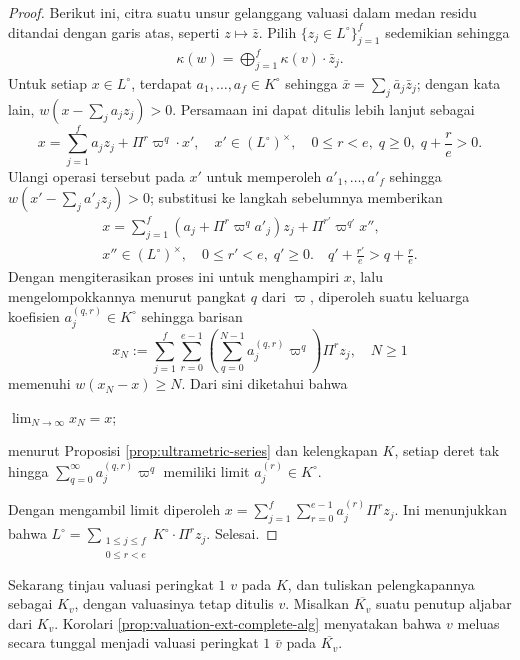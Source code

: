 \begin{proof}
	Berikut ini, citra suatu unsur gelanggang valuasi dalam medan residu ditandai dengan garis atas, seperti $z \mapsto \bar{z}$. Pilih $\{z_j \in L^\circ \}_{j=1}^f$ sedemikian sehingga
	\begin{gather*}
		\kappa(w) = \bigoplus_{j=1}^f \kappa(v) \cdot \bar{z}_j.
	\end{gather*}
	Untuk setiap $x \in L^\circ$, terdapat $a_1, \ldots, a_f \in K^\circ$ sehingga $\bar{x} = \sum_j \bar{a}_j \bar{z}_j$; dengan kata lain, $w(x - \sum_j a_j z_j) > 0$. Persamaan ini dapat ditulis lebih lanjut sebagai
	\[ x = \sum_{j=1}^f a_j z_j + \Pi^r \varpi^q \cdot x', \quad x' \in (L^\circ)^\times, \quad 0 \leq r < e, \; q \geq 0, \; q + \frac{r}{e} > 0. \]
	Ulangi operasi tersebut pada $x'$ untuk memperoleh $a'_1, \ldots, a'_f$ sehingga $w(x' - \sum_j a'_j z_j) > 0$; substitusi ke langkah sebelumnya memberikan
	\begin{gather*}
		x = \sum_{j=1}^f \left( a_j + \Pi^r \varpi^q a'_j \right) z_j + \Pi^{r'} \varpi^{q'}x'', \\
		x'' \in (L^\circ)^\times, \quad 0 \leq r' < e, \; q' \geq 0. \quad q'+ \frac{r'}{e} > q + \frac{r}{e}.
	\end{gather*}
	Dengan mengiterasikan proses ini untuk menghampiri $x$, lalu mengelompokkannya menurut pangkat $q$ dari $\varpi$, diperoleh suatu keluarga koefisien $a_j^{(q,r)} \in K^\circ$ sehingga barisan
	\[ x_N := \sum_{j=1}^f \sum_{r=0}^{e-1} \left(\sum_{q=0}^{N-1} a_j^{(q,r)} \varpi^q \right) \Pi^r z_j, \quad N \geq 1 \]
	memenuhi $w(x_N - x) \geq N$. Dari sini diketahui bahwa
	\begin{compactitem}
		\item $\lim_{N \to \infty} x_N = x$;
		\item menurut Proposisi \ref{prop:ultrametric-series} dan kelengkapan $K$, setiap deret tak hingga $\sum_{q=0}^\infty a_j^{(q,r)} \varpi^q$ memiliki limit $a_j^{(r)} \in K^\circ$.
	\end{compactitem}
	Dengan mengambil limit diperoleh $x = \sum_{j=1}^f \sum_{r=0}^{e-1} a_j^{(r)} \Pi^r z_j$. Ini menunjukkan bahwa $L^\circ = \displaystyle\sum_{\substack{1 \leq j \leq f \\ 0 \leq r < e}} K^\circ \cdot \Pi^r z_j$. Selesai.
\end{proof}

Sekarang tinjau valuasi peringkat $1$ $v$ pada $K$, dan tuliskan pelengkapannya sebagai $K_v$, dengan valuasinya tetap ditulis $v$. Misalkan $\overline{K_v}$ suatu penutup aljabar dari $K_v$. Korolari  \ref{prop:valuation-ext-complete-alg} menyatakan bahwa $v$ meluas secara tunggal menjadi valuasi peringkat $1$ $\bar{v}$ pada $\overline{K_v}$.

